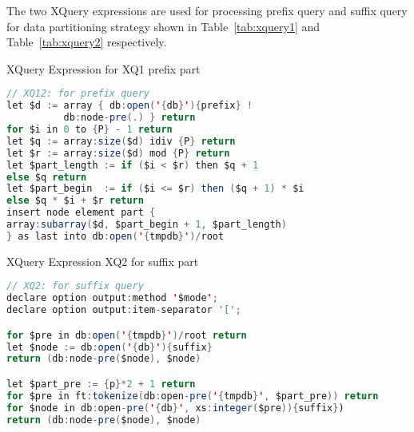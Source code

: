 The two XQuery expressions are used for processing prefix query 
and suffix query for data partitioning strategy shown in Table~\ref{tab:xquery1}
and Table~\ref{tab:xquery2} respectively.

\begin{table}
\centering
\label{tab:xquery1}
\caption{XQuery Expression for XQ1 prefix part}
  \footnotesize
\begin{lstlisting}[language=java,frame=single]
// XQ12: for prefix query 
let $d := array { db:open('{db}'){prefix} ! 
          db:node-pre(.) } return
for $i in 0 to {P} - 1 return
let $q := array:size($d) idiv {P} return
let $r := array:size($d) mod {P} return
let $part_length := if ($i < $r) then $q + 1
else $q return
let $part_begin  := if ($i <= $r) then ($q + 1) * $i
else $q * $i + $r return
insert node element part {
array:subarray($d, $part_begin + 1, $part_length)
} as last into db:open('{tmpdb}')/root
\end{lstlisting}
\end{table}
 

\begin{table}
	\centering
	\label{tab:xquery2}
	\caption{XQuery Expression XQ2 for suffix part}

  \footnotesize
\begin{lstlisting}[language=java,frame=single]
// XQ2: for suffix query 
declare option output:method '$mode';
declare option output:item-separator '[';

for $pre in db:open('{tmpdb}')/root return
let $node := db:open('{db}'){suffix}
return (db:node-pre($node), $node)

let $part_pre := {p}*2 + 1 return
for $pre in ft:tokenize(db:open-pre('{tmpdb}', $part_pre)) return
for $node in db:open-pre('{db}', xs:integer($pre)){suffix})
return (db:node-pre($node), $node) 
\end{lstlisting}
\end{table}


 